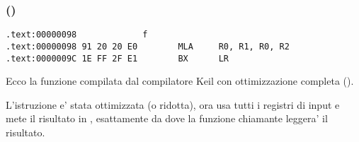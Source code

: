 \subsubsection{\OptimizingKeilVI (\ARMMode)}

\begin{lstlisting}[label=ARM_leaf_example1]
.text:00000098             f
.text:00000098 91 20 20 E0        MLA     R0, R1, R0, R2
.text:0000009C 1E FF 2F E1        BX      LR
\end{lstlisting}


Ecco la funzione \ttf compilata dal compilatore Keil con ottimizzazione completa (\Othree).

L'istruzione \MOV e' stata ottimizzata (o ridotta), ora  usa tutti i registri di input e mete il risultato in , esattamente da dove
la funzione chiamante leggera' il risultato.
